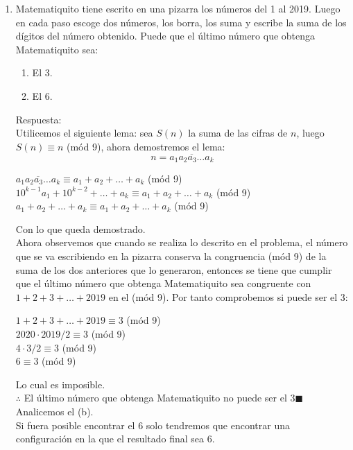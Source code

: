 \documentclass{book}
\begin{document}
\begin{enumerate}
    \item Matematiquito tiene escrito en una pizarra los números del 1 al 2019. Luego en cada paso escoge dos números, los borra, los suma y escribe la suma de los dígitos del número obtenido. Puede que el último número que obtenga Matematiquito sea:
          \begin{enumerate}
              \item  El 3.
              \item El 6.
          \end{enumerate}
          Respuesta:\\
          Utilicemos el siguiente lema: sea $S(n)$ la suma de las cifras de $n$, luego $S(n)\equiv n$ (mód 9), ahora demostremos el lema:
          $$n=\overline{a_1a_2a_3\ldots a_k}$$
          \begin{center}
              $\overline{a_1a_2a_3\ldots a_k}\equiv a_1+a_2+\ldots +a_k$ (mód 9)\\
              $10^{k-1}a_1+10^{k-2}+\ldots+a_k\equiv a_1+a_2+\ldots +a_k$ (mód 9)\\
              $a_1+a_2+\ldots +a_k\equiv a_1+a_2+\ldots +a_k$ (mód 9)
          \end{center}
          Con lo que queda demostrado.\\
          Ahora observemos que cuando se realiza lo descrito en el problema, el número que se va escribiendo en la pizarra conserva la congruencia (mód 9) de la suma de los dos anteriores que lo generaron, entonces se tiene que cumplir que el último número que obtenga Matematiquito sea congruente con $1+2+3+\ldots+2019$ en el (mód 9). Por tanto comprobemos si puede ser el 3:
          \begin{center}
              $1+2+3+\ldots+2019\equiv 3$ (mód 9)\\
              $2020\cdot 2019/2\equiv 3$ (mód 9)\\
              $4\cdot 3/2\equiv 3$ (mód 9)\\
              $6\equiv 3$ (mód 9)\\
          \end{center}
          Lo cual es imposible.\\
          $\therefore$ El último número que obtenga Matematiquito no puede ser el 3$\blacksquare$\\
          Analicemos el (b).\\
          Si fuera posible encontrar el 6 solo tendremos que encontrar una configuración en la que el resultado final sea 6.\\

\end{enumerate}
\end{document}
